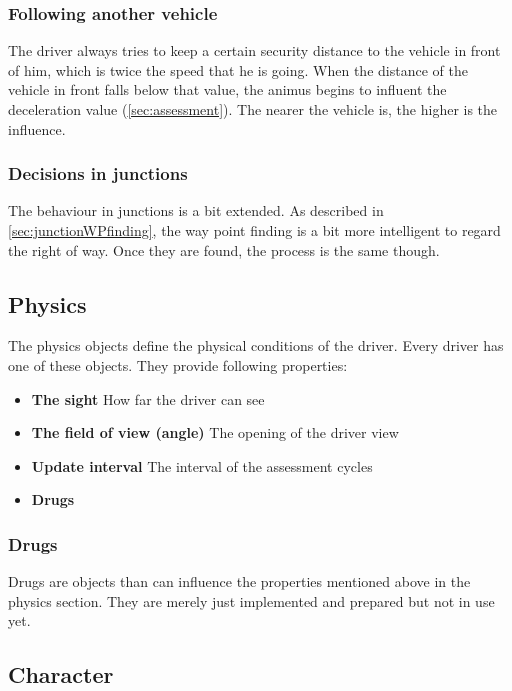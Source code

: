 \subsubsection{Following another vehicle}

The driver always tries to keep a certain security distance to the
vehicle in front of him, which is twice the speed that he is going.
When the distance of the vehicle in front falls below that value, the
animus begins to influent the deceleration value (\ref{sec:assessment}).
The nearer the vehicle is, the higher is the influence.

\subsubsection{Decisions in junctions}

The behaviour in junctions is a bit extended. As described in 
\ref{sec:junctionWPfinding}, the way point finding is a bit more intelligent
to regard the right of way. Once they are found, the process is the same
though.

\subsection{Physics}
\label{sec:physics}

The physics objects define the physical conditions of the driver. Every
driver has one of these objects. They provide following properties:

\begin{itemize}
\item \textbf{The sight} How far the driver can see
\item \textbf{The field of view (angle)} The opening of the driver view
\item \textbf{Update interval} The interval of the assessment cycles
\item \textbf{Drugs}
\end{itemize}

\subsubsection{Drugs}
\label{sec:drugs}

Drugs are objects than can influence the properties mentioned above in the
physics section. They are merely just implemented and prepared but not 
in use yet.

\subsection{Character}
\label{sec:character}

